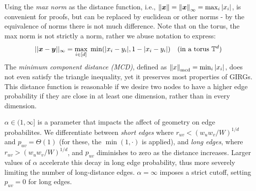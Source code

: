 
Using the \textit{max norm} as the distance function, i.e., $\left\lVert \bm{x}\right\rVert = \left\lVert \bm{x}\right\rVert_\infty = \max_i |x_i|$, is convenient for proofs, but can be replaced by euclidean or other norms - by the equivalence of norms there is not much difference. Note that on the torus, the max norm is not strictly a norm, rather we abuse notation to express:
\begin{equation}
    ||\bm{x} - \bm{y}||_\infty = \max_{i \in [d]} \; \min(|x_i - y_i|, 1 - |x_i - y_i|)
    \quad \text{(in a torus $\mathbb{T}^d$)}
\end{equation}
The \textit{minimum component distance (MCD)}, defined as $\left\lVert x\right\rVert_{\mathrm{mcd}} = \min_i |x_i|$, does not even satisfy the triangle inequality, yet it preserves most properties of GIRGs. This distance function is reasonable if we desire two nodes to have a higher edge probability if they are close in at least one dimension, rather than in every dimension.

$\alpha \in (1, \infty]$ is a parameter that impacts the affect of geometry on edge probabilites. We differentiate between \textit{short edges} where $r_{uv} < (w_u w_v / W)^{1/d}$ and $p_{uv} = \Theta(1)$ (for these, the $\min(1, \cdot)$ is applied), and \textit{long edges}, where $r_{uv} > (w_u w_v / W)^{1/d}$, and $p_{uv}$ diminishes to zero as the distance increases. Larger values of $\alpha$ accelerate this decay in long edge probability, thus more severely limiting the number of long-distance edges. $\alpha=\infty$ imposes a strict cutoff, setting $p_{uv} = 0$ for long edges.

